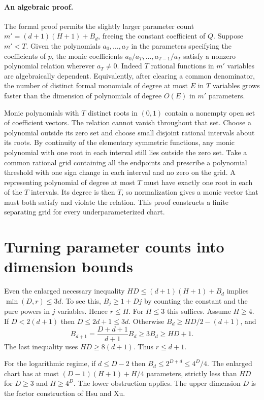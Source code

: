 \documentclass[11pt]{article}
\begin{document}
\paragraph{An algebraic proof.}
The formal proof permits the slightly larger parameter count $m'=(d+1)(H+1)+B_d$, freeing the constant coefficient of $Q$. Suppose $m'<T$. Given the polynomials $a_0,\ldots,a_T$ in the parameters specifying the coefficients of $p$, the monic coefficients $a_0/a_T,\ldots,a_{T-1}/a_T$ satisfy a nonzero polynomial relation wherever $a_T\ne0$. Indeed $T$ rational functions in $m'$ variables are algebraically dependent. Equivalently, after clearing a common denominator, the number of distinct formal monomials of degree at most $E$ in $T$ variables grows faster than the dimension of polynomials of degree $O(E)$ in $m'$ parameters.

Monic polynomials with $T$ distinct roots in $(0,1)$ contain a nonempty open set of coefficient vectors. The relation cannot vanish throughout that set. Choose a polynomial outside its zero set and choose small disjoint rational intervals about its roots. By continuity of the elementary symmetric functions, any monic polynomial with one root in each interval still lies outside the zero set. Take a common rational grid containing all the endpoints and prescribe a polynomial threshold with one sign change in each interval and no zero on the grid. A representing polynomial of degree at most $T$ must have exactly one root in each of the $T$ intervals. Its degree is then $T$, so normalization gives a monic vector that must both satisfy and violate the relation. This proof constructs a finite separating grid for every underparameterized chart.

\section{Turning parameter counts into dimension bounds}
Even the enlarged necessary inequality $HD\le (d+1)(H+1)+B_d$ implies $\min(D,r)\le3d$. To see this, $B_j\ge1+Dj$ by counting the constant and the pure powers in $j$ variables. Hence $r\le H$. For $H\le3$ this suffices. Assume $H\ge4$. If $D<2(d+1)$ then $D\le 2d+1\le3d$. Otherwise $B_d\ge HD/2-(d+1)$, and
\[
 B_{d+1}=\frac{D+d+1}{d+1} B_d\ge3B_d\ge HD+1.
\]
The last inequality uses $HD\ge8(d+1)$. Thus $r\le d+1$.

For the logarithmic regime, if $d\le D-2$ then $B_d\le2^{D+d}\le 4^D/4$. The enlarged chart has at most $(D-1)(H+1)+H/4$ parameters, strictly less than $HD$ for $D\ge3$ and $H\ge4^D$. The lower obstruction applies. The upper dimension $D$ is the factor construction of Hsu and Xu.
\end{document}
